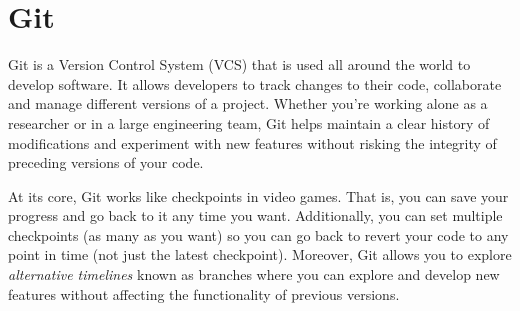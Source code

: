 \documentclass[12pt]{article}
\begin{document}
\section{Git}
Git is a Version Control System (VCS) that is used all around the world to
develop software. It allows developers to track changes to their code,
collaborate and manage different versions of a project. Whether you're working
alone as a researcher or in a large engineering team, Git helps maintain a
clear history of modifications and experiment with new features without risking
the integrity of preceding versions of your code.

At its core, Git works like checkpoints in video games. That is, you can save
your progress and go back to it any time you want. Additionally, you can set
multiple checkpoints (as many as you want) so you can go back to revert your
code to any point in time (not just the latest checkpoint). Moreover, Git
allows you to explore \textit{alternative timelines} known as branches where
you can explore and develop new features without affecting the functionality
of previous versions.

\end{document}
